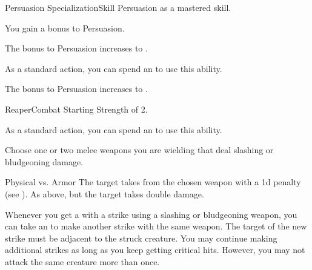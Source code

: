     \begin{feat}{Persuasion Specialization}{Skill}
        \featpre Persuasion as a mastered skill.
        \featben

         You gain a  bonus to Persuasion.

        \ff[2]{}

         The bonus to Persuasion increases to .

         As a standard action, you can spend an  to use this ability.

         The bonus to Persuasion increases to .
    \end{feat}

    \begin{feat}{Reaper}{Combat}
        \featpre Starting Strength of 2.

         As a standard action, you can spend an  to use this ability.
        \begin{ability}
            \begin{spelltargetinginfo}
                \spellspecial Choose one or two melee weapons you are wielding that deal slashing or bludgeoning damage.
            \end{spelltargetinginfo}
            \begin{spelleffects}
                \begin{spellattack}{Physical vs. Armor}
                    \spellsuccess The target takes  from the chosen weapon with a \minus1d penalty (see ).
                    \spellcritical As above, but the target takes double damage.
                \end{spellattack}
            \end{spelleffects}
        \end{ability}

         Whenever you get a  with a strike using a slashing or bludgeoning weapon, you can take an  to make another strike with the same weapon.
        The target of the new strike must be adjacent to the struck creature.
        You may continue making additional strikes as long as you keep getting critical hits.
        However, you may not attack the same creature more than once.


\end{feat}
